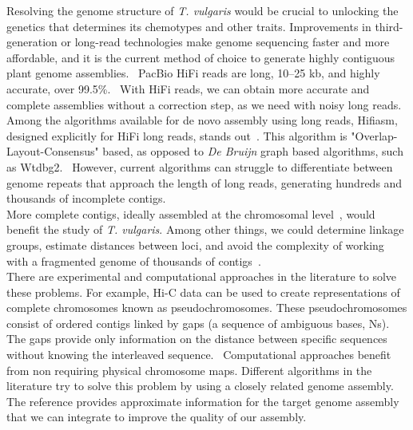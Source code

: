 Resolving the genome structure of \textit{T. vulgaris} would be crucial to unlocking the genetics that determines its chemotypes and other traits.  Improvements in third-generation or long-read technologies make genome sequencing faster and more affordable, and it is the current method of choice to generate highly contiguous plant genome assemblies.~\cite{puckerPlantGenomeSequence2022} PacBio HiFi reads are long, 10–25 kb, and highly accurate, over 99.5\%.~\cite{honHighlyAccurateLongread2020} With HiFi reads, we can obtain more accurate and complete assemblies without a correction step, as we need with noisy long reads.~\cite{puckerPlantGenomeSequence2022}\\

Among the algorithms available for de novo assembly using long reads, Hifiasm, designed explicitly for HiFi long reads, stands out~\cite{chengHaplotyperesolvedNovoAssembly2021}. This algorithm is "Overlap-Layout-Consensus" based, as opposed to \textit{De Bruijn} graph based algorithms, such as Wtdbg2.~\cite{huangAlignGraph2SimilarGenomeassisted2021} However, current algorithms can struggle to differentiate between genome repeats that approach the length of long reads, generating hundreds and thousands of incomplete contigs.~\cite{huangAlignGraph2SimilarGenomeassisted2021} \\

More complete contigs, ideally assembled at the chromosomal level~\cite{AssemblyTerminologyGenome}, would benefit the study of \textit{T. vulgaris}. Among other things, we could determine linkage groups, estimate distances between loci, and avoid the complexity of working with a fragmented genome of thousands of contigs~\cite{tamazianChromosomerReferencebasedGenome2016}.\\

There are experimental and computational approaches in the literature to solve these problems. For example, Hi-C data can be used to create representations of complete chromosomes known as pseudochromosomes. These pseudochromosomes consist of ordered contigs linked by gaps (a sequence of ambiguous bases, Ns). The gaps provide only information on the distance between specific sequences without knowing the interleaved sequence.~\cite{puckerPlantGenomeSequence2022} Computational approaches benefit from non requiring physical chromosome maps. Different algorithms in the literature try to solve this problem by using a closely related genome assembly. The reference provides approximate information for the target genome assembly that we can integrate to improve the quality of our assembly.~\cite{huangAlignGraph2SimilarGenomeassisted2021} \\


